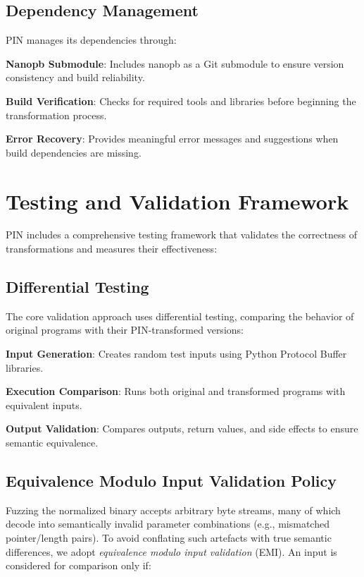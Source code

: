 \documentclass[doublespace,nopageskip]{VTthesis} %
\begin{document}
	\subsection{Dependency Management}
	
	PIN manages its dependencies through:
	
	\textbf{Nanopb Submodule}: Includes nanopb as a Git submodule to ensure version consistency and build reliability.
	
	\textbf{Build Verification}: Checks for required tools and libraries before beginning the transformation process.
	
	\textbf{Error Recovery}: Provides meaningful error messages and suggestions when build dependencies are missing.
	
	\section{Testing and Validation Framework} \label{se:testing_validation}
	
	PIN includes a comprehensive testing framework that validates the correctness of transformations and measures their effectiveness:
	
\subsection{Differential Testing}

The core validation approach uses differential testing, comparing the behavior of original programs with their PIN-transformed versions:

\textbf{Input Generation}: Creates random test inputs using Python Protocol Buffer libraries.

\textbf{Execution Comparison}: Runs both original and transformed programs with equivalent inputs.

\textbf{Output Validation}: Compares outputs, return values, and side effects to ensure semantic equivalence.

\subsection{Equivalence Modulo Input Validation Policy} \label{se:emi_policy}

	Fuzzing the normalized binary accepts arbitrary byte streams, many of which decode into semantically invalid parameter combinations (e.g., mismatched pointer/length pairs). To avoid conflating such artefacts with true semantic differences, we adopt \emph{equivalence modulo input validation} (EMI). An input is considered for comparison only if:
	
\end{document}
